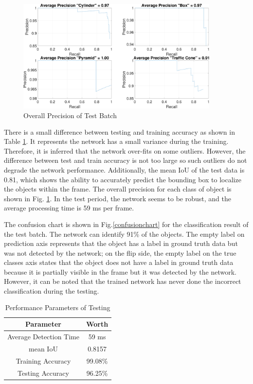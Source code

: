 \begin{figure}
    \centering
    \includegraphics[width=0.9\textwidth]{Images/Precision.pdf}
    \caption{Overall Precision of Test Batch}
    \label{Precision_plot}
\end{figure}

There is a small difference between testing and training accuracy as shown in Table \ref{testperformance}. It represents the network has a small variance during the training. Therefore,  it is inferred that the network over-fits on some outliers. However, the difference between test and train accuracy is not too large so such outliers do not degrade the network performance. Additionally, the mean IoU of the test data is 0.81, which shows the ability to accurately predict the bounding box to localize the objects within the frame. The overall precision for each class of object is shown in Fig. \ref{Precision_plot}. In the test period, the network seems to be robust, and the average processing time is 59 ms per frame. 

The confusion chart is shown in Fig.\ref{confusionchart} for the classification result of the test batch. The network can identify 91\% of the objects. The empty label on prediction axis represents that the object has a label in ground truth data but was not detected by the network; on the flip side, the empty label on the true classes axis states that the object does not have a label in ground truth data because it is partially visible in the frame but it was detected by the network. However, it can be noted that the trained network has never done the incorrect classification during the testing.

\begin{table}[b]
    \centering
    \begin{tabular}{|c|c|}
        \hline
        \textbf{Parameter} & \textbf{Worth} \\
        \hline
        Average Detection Time & 59 ms\\
        \hline
        mean IoU & 0.8157\\
        \hline
        Training Accuracy & 99.08\% \\
        \hline
        Testing Accuracy & 96.25\% \\
        \hline  
    \end{tabular}
    \caption{Performance Parameters of Testing}
    \label{testperformance}
\end{table}

